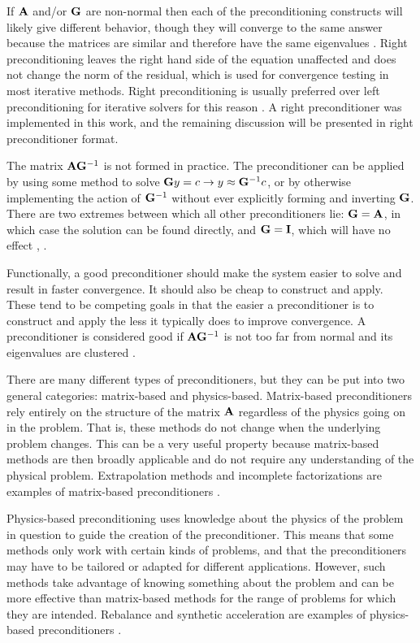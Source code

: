 If $\mathbf{A}$ and/or $\mathbf{G}$ are non-normal then each of the preconditioning constructs will likely give different behavior, though they will converge to the same answer because the matrices are similar and therefore have the same eigenvalues  \cite{Benzi2002}. Right preconditioning leaves the right hand side of the equation unaffected and does not change the norm of the residual, which is used for convergence testing in most iterative methods. Right preconditioning is usually preferred over left preconditioning for iterative solvers for this reason \cite{Knoll2004}. A right preconditioner was implemented in this work, and the remaining discussion will be presented in right preconditioner format. 

The matrix $\mathbf{A}\mathbf{G}^{-1}$ is not formed in practice. The preconditioner can be applied by using some method to solve $\mathbf{G}y=c \to y \approx \mathbf{G}^{-1}c$, or by otherwise implementing the action of $\mathbf{G}^{-1}$ without ever explicitly forming and inverting $\mathbf{G}$. There are two extremes between which all other preconditioners lie: $\mathbf{G} = \mathbf{A}$, in which case the solution can be found directly, and $\mathbf{G} = \mathbf{I}$, which will have no effect \cite{Benzi2002}, \cite{Trefethen1997}. 

Functionally, a good preconditioner should make the system easier to solve and result in faster convergence. It should also be cheap to construct and apply. These tend to be competing goals in that the easier a preconditioner is to construct and apply the less it typically does to improve convergence. A preconditioner is considered good if $\mathbf{A}\mathbf{G}^{-1}$ is not too far from normal and its eigenvalues are clustered \cite{Trefethen1997}. 

There are many different types of preconditioners, but they can be put into two general categories: matrix-based and physics-based. Matrix-based preconditioners rely entirely on the structure of the matrix $\mathbf{A}$ regardless of the physics going on in the problem. That is, these methods do not change when the underlying problem changes. This can be a very useful property because matrix-based methods are then broadly applicable and do not require any understanding of the physical problem. Extrapolation methods and incomplete factorizations are examples of matrix-based preconditioners \cite{Trefethen1997}.

Physics-based preconditioning uses knowledge about the physics of the problem in question to guide the creation of the preconditioner. This means that some methods only work with certain kinds of problems, and that the preconditioners may have to be tailored or adapted for different applications. However, such methods take advantage of knowing something about the problem and can be more effective than matrix-based methods for the range of problems for which they are intended. Rebalance and synthetic acceleration are examples of physics-based preconditioners \cite{Trefethen1997}.

